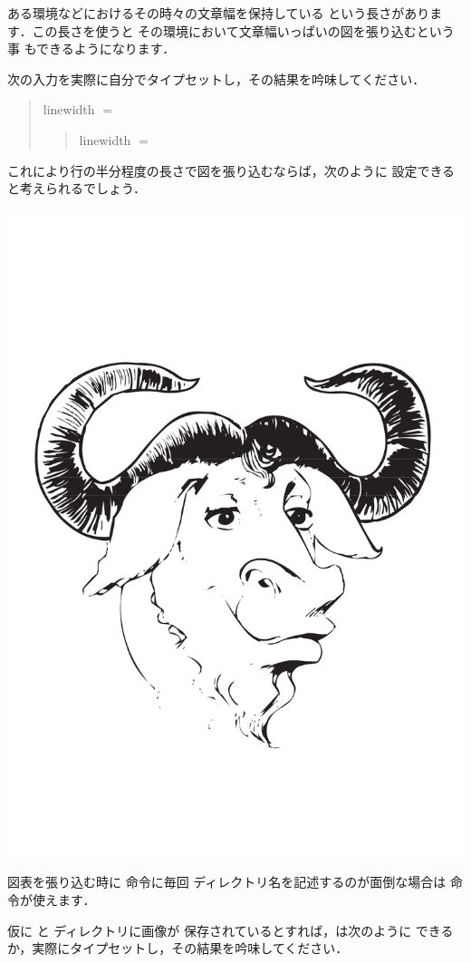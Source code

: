 \begin{Prob}
ある環境などにおけるその時々の文章幅を保持している 
という長さがあります．この長さを使うと
その環境において文章幅いっぱいの図を張り込むという事
もできるようになります．

 次の入力を実際に自分でタイプセットし，その結果を吟味してください．
\begin{InOut}
\begin{quote}
  linewidth $=$ \the\linewidth\par
  \begin{quote}
    linewidth $=$ \the\linewidth
  \end{quote}
\end{quote}
\end{InOut}

これにより行の半分程度の長さで図を張り込むならば，次のように
設定できると考えられるでしょう．

\begin{InTeX}
\includegraphics[width=.47\linewidth]{images/gnu-head}\\ 
\end{InTeX}
\end{Prob}

\begin{Prob}
図表を張り込む時に 命令に毎回
ディレクトリ名を記述するのが面倒な場合は 
命令が使えます．

\begin{Syntax}
\end{Syntax}

仮に  と  ディレクトリに画像が
保存されているとすれば，は次のように
できるか，実際にタイプセットし，その結果を吟味してください．

\begin{InTeX}
\graphicspath{{images/}{geolay/}}
\end{InTeX}
\end{Prob} 

